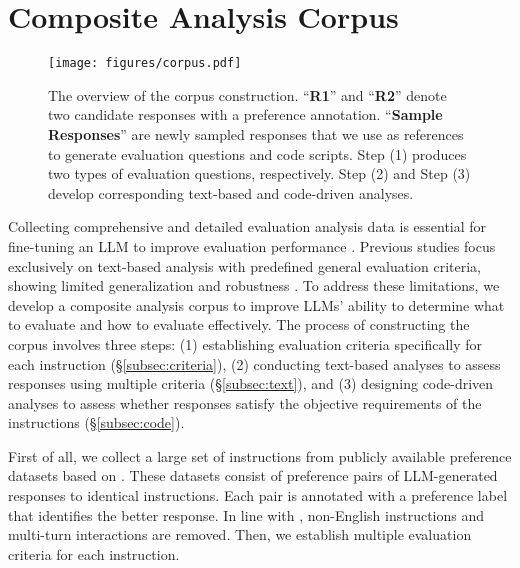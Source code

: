 \section{Composite Analysis Corpus}

\begin{figure*}[t!]
	\centering
	\texttt{[image: figures/corpus.pdf]}
	\caption{The overview of the corpus construction. ``\textbf{R1}'' and ``\textbf{R2}'' denote two candidate responses with a preference annotation. ``\textbf{Sample Responses}'' are newly sampled responses that we use as references to generate evaluation questions and code scripts. Step (1) produces two types of evaluation questions, respectively. Step (2) and Step (3) develop corresponding text-based and code-driven analyses.}
	\label{corpus}
\end{figure*}

Collecting comprehensive and detailed evaluation analysis data is essential for fine-tuning an LLM to improve evaluation performance \cite{auto-j, themis}. Previous studies \cite{auto-j, themis, prometheus, prometheus2} focus exclusively on text-based analysis with predefined general evaluation criteria, showing limited generalization and robustness \cite{sft_eval_limit}. To address these limitations, we develop a composite analysis corpus to improve LLMs' ability to determine what to evaluate and how to evaluate effectively. The process of constructing the corpus involves three steps: (1) establishing evaluation criteria specifically for each instruction (§\ref{subsec:criteria}), (2) conducting text-based analyses to assess responses using multiple criteria (§\ref{subsec:text}), and (3) designing code-driven analyses to assess whether responses satisfy the objective requirements of the instructions (§\ref{subsec:code}). 

First of all, we collect a large set of instructions from publicly available preference datasets based on \citet{auto-j}. These datasets \cite{mtbench, webgpt, gptj-pair, saferlhf} consist of preference pairs of LLM-generated responses to identical instructions. Each pair is annotated with a preference label that identifies the better response. In line with \citet{auto-j}, non-English instructions and multi-turn interactions are removed. Then, we establish multiple evaluation criteria for each instruction.

